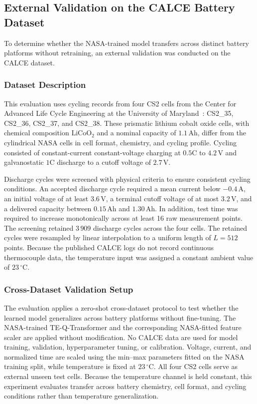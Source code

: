 \documentclass[a4paper,fleqn]{cas-sc}
\begin{document}
\subsection{External Validation on the CALCE Battery Dataset}\label{sec:calce}

To determine whether the NASA-trained model transfers across distinct battery platforms without retraining, an external validation was conducted on the CALCE dataset.

\subsubsection{Dataset Description}\label{sec:calce_description}

This evaluation uses cycling records from four CS2 cells from the Center for Advanced Life Cycle Engineering at the University of Maryland~\citep{w9rg-7173-25}: CS2\_35, CS2\_36, CS2\_37, and CS2\_38. These prismatic lithium cobalt oxide cells, with chemical composition $\mathrm{LiCoO}_2$ and a nominal capacity of $1.1$\,Ah, differ from the cylindrical NASA cells in cell format, chemistry, and cycling profile. Cycling consisted of constant-current constant-voltage charging at $0.5\mathrm{C}$ to $4.2$\,V and galvanostatic $1\mathrm{C}$ discharge to a cutoff voltage of $2.7$\,V.

Discharge cycles were screened with physical criteria to ensure consistent cycling conditions. An accepted discharge cycle required a mean current below $-0.4\,\mathrm{A}$, an initial voltage of at least $3.6\,\mathrm{V}$, a terminal cutoff voltage of at most $3.2\,\mathrm{V}$, and a delivered capacity between $0.15$\,Ah and $1.30$\,Ah. In addition, test time was required to increase monotonically across at least 16 raw measurement points. The screening retained $3\,909$ discharge cycles across the four cells. The retained cycles were resampled by linear interpolation to a uniform length of $L = 512$ points. Because the published CALCE logs do not record continuous thermocouple data, the temperature input was assigned a constant ambient value of $23\,^\circ\mathrm{C}$.

\subsubsection{Cross-Dataset Validation Setup}\label{sec:calce_setup}

The evaluation applies a zero-shot cross-dataset protocol to test whether the learned model generalizes across battery platforms without fine-tuning. The NASA-trained TE-Q-Transformer and the corresponding NASA-fitted feature scaler are applied without modification. No CALCE data are used for model training, validation, hyperparameter tuning, or calibration. Voltage, current, and normalized time are scaled using the min--max parameters fitted on the NASA training split, while temperature is fixed at $23\,^\circ\mathrm{C}$. All four CS2 cells serve as external unseen test cells. Because the temperature channel is held constant, this experiment evaluates transfer across battery chemistry, cell format, and cycling conditions rather than temperature generalization.
\end{document}
